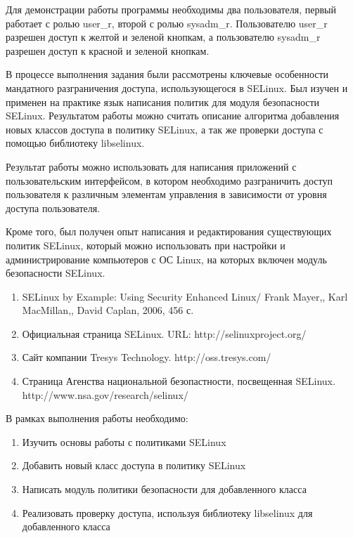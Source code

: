 \documentclass{./../class/UIR}
\begin{document}
	Для демонстрации работы программы необходимы два пользователя, первый работает
	с ролью user\_r, второй с ролью sysadm\_r. Пользователю user\_r разрешен доступ
	к желтой и зеленой кнопкам, а пользователю sysadm\_r разрешен доступ к красной
	и зеленой кнопкам.
	
	
    В процессе выполнения задания были рассмотрены ключевые особенности
    мандатного разграничения доступа, использующегося в SELinux. Был изучен и
    применен на практике язык написания политик для модуля безопасности
    SELinux. Результатом работы можно считать описание алгоритма добавления
    новых классов доступа в политику SELinux, а так же проверки доступа с
    помощью библиотеку libselinux.

    Результат работы можно использовать для написания приложений с
    пользовательским интерфейсом, в котором необходимо разграничить доступ
    пользователя к различным элементам управления в зависимости от уровня
    доступа пользователя.

    Кроме того, был получен опыт написания и редактирования существующих политик
    SELinux, который можно использовать при настройки и администрирование
    компьютеров с ОС Linux, на которых включен модуль безопасности SELinux.

    \begin{enumerate}
      \item SELinux by Example: Using Security Enhanced Linux/ Frank Mayer,,
      Karl MacMillan,, David Caplan, 2006, 456 с.
      \item Официальная страница SELinux. URL: http://selinuxproject.org/
      \item Сайт компании Tresys Technology. http://oss.tresys.com/
      \item Страница Агенства национальной безопастности, посвещенная SELinux.
      http://www.nsa.gov/research/selinux/
    \end{enumerate}

\ReviewOfSupervisorTemplate

%
%

\begin{TaskOfStudent}
В рамках выполнения работы необходимо:
\begin{enumerate}
  \item Изучить основы работы с политиками SELinux
  \item Добавить новый класс доступа в политику SELinux
  \item Написать модуль политики безопасности для добавленного класса
  \item Реализовать проверку доступа, используя библиотеку libselinux для
  добавленного класса
\end{enumerate}
\end{TaskOfStudent}
\end{document}
